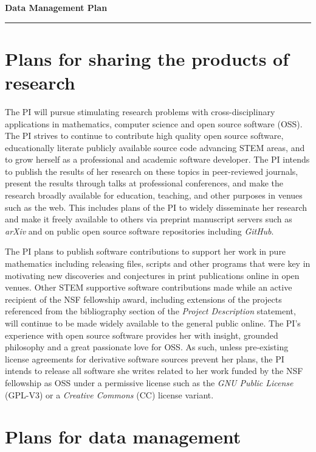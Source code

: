 \documentclass[10pt,reqno,letterpaper]{article}
\theoremstyle{plain}
\numberwithin{theorem}{section}
\theoremstyle{definition}
\begin{document}
\newcommand{\GRFPEssayTitle}{NSF Postdoctoral Fellowship Project Summary}

\noindent
{\bf\LARGE{Data Management Plan}}
\smallskip\hrule\smallskip

\section{Plans for sharing the products of research}

The PI will pursue stimulating research problems 
with cross-disciplinary applications in mathematics, computer science and open source software (OSS). 
The PI strives to continue to contribute high quality open source software, educationally 
literate publicly available source code advancing STEM areas, and to grow herself as a 
professional and academic software developer. 
The PI intends to 
publish the results of her research on these topics in peer-reviewed journals, present 
the results through talks at professional conferences, and make the research broadly 
available for education, teaching, and other purposes in venues such as the web. 
This includes plans of the PI to widely disseminate her research and make it 
freely available to others via preprint manuscript servers such as \emph{arXiv} and 
on public open source software repositories including \emph{GitHub}. 

The PI plans to publish software 
contributions to support her work in pure mathematics including releasing files, scripts and 
other programs that were key in motivating new discoveries and conjectures in print publications 
online in open venues. 
Other STEM supportive software contributions made while an active recipient of the NSF fellowship award, 
including extensions of the projects referenced from the bibliography 
section of the \emph{Project Description} statement, will continue to be made widely available to the 
general public online. 
The PI's experience with open source software provides her with  
insight, grounded philosophy and a great passionate love for OSS. 
As such, unless pre-existing license agreements for derivative software sources prevent her plans, the PI 
intends to release all software she writes related to her work 
funded by the NSF fellowship as OSS under a permissive 
license such as the \emph{GNU Public License} (GPL-V3) or a 
\emph{Creative Commons} (CC) license variant. 

\section{Plans for data management} 
\end{document}

